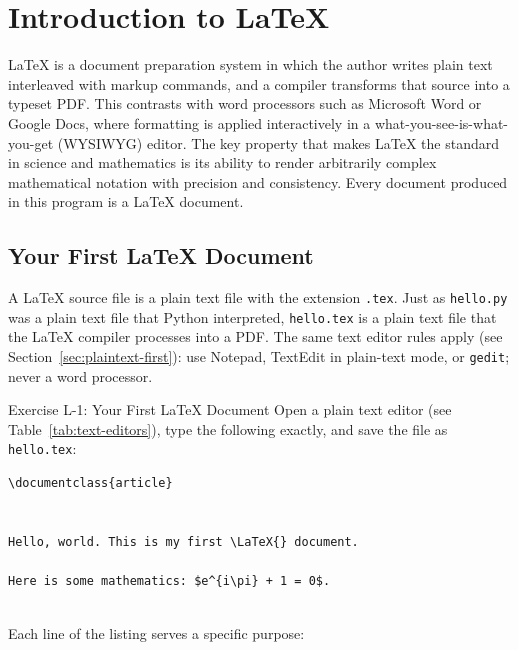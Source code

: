 \chapter{Introduction to \LaTeX{}}
\label{ch:latex}

\LaTeX{} is a document preparation system in which the author writes
plain text interleaved with markup commands, and a compiler transforms
that source into a typeset PDF. This contrasts with word processors
such as Microsoft Word or Google Docs, where formatting is applied
interactively in a what-you-see-is-what-you-get (WYSIWYG) editor.
The key property that makes \LaTeX{} the standard in science and
mathematics is its ability to render arbitrarily complex mathematical
notation with precision and consistency. Every document produced in
this program is a \LaTeX{} document.

\section{Your First \LaTeX{} Document}
\label{sec:first-latex-doc}

A \LaTeX{} source file is a plain text file with the extension
\texttt{.tex}. Just as \texttt{hello.py} was a plain text file that
Python interpreted, \texttt{hello.tex} is a plain text file that the
\LaTeX{} compiler processes into a PDF. The same text editor rules
apply (see Section~\ref{sec:plaintext-first}): use Notepad, TextEdit
in plain-text mode, or \texttt{gedit}; never a word processor.

\begin{infobox}{Exercise L-1: Your First \LaTeX{} Document}
Open a plain text editor (see Table~\ref{tab:text-editors}), type the
following exactly, and save the file as \texttt{hello.tex}:

\begin{lstlisting}[style=inlineStyle]
\documentclass{article}


Hello, world. This is my first \LaTeX{} document.

Here is some mathematics: $e^{i\pi} + 1 = 0$.


\end{lstlisting}
\end{infobox}

Each line of the listing serves a specific purpose:

